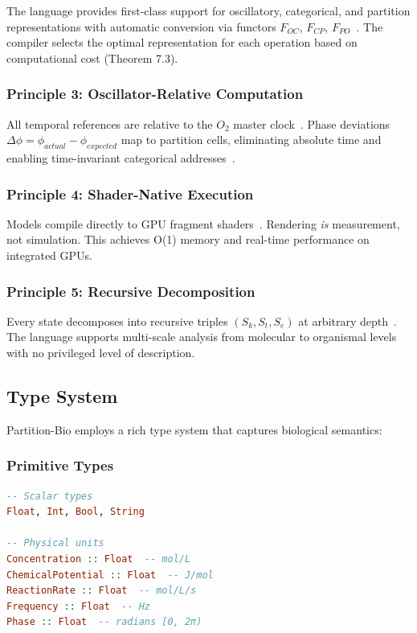 \documentclass[12pt,a4paper]{article}
\begin{document}
The language provides first-class support for oscillatory, categorical, and partition representations with automatic conversion via functors $F_{OC}$, $F_{CP}$, $F_{PO}$~\cite{sachikonye2026sentropy}. The compiler selects the optimal representation for each operation based on computational cost (Theorem 7.3).

\subsubsection{Principle 3: Oscillator-Relative Computation}

All temporal references are relative to the $O_2$ master clock~\cite{sachikonye2026equations}. Phase deviations $\Delta\phi = \phi_{actual} - \phi_{expected}$ map to partition cells, eliminating absolute time and enabling time-invariant categorical addresses~\cite{sachikonye2026cellular}.

\subsubsection{Principle 4: Shader-Native Execution}

Models compile directly to GPU fragment shaders~\cite{sachikonye2026sbs}. Rendering \textit{is} measurement, not simulation. This achieves O(1) memory and real-time performance on integrated GPUs.

\subsubsection{Principle 5: Recursive Decomposition}

Every state decomposes into recursive triples $(S_k, S_t, S_e)$ at arbitrary depth~\cite{sachikonye2026sentropy}. The language supports multi-scale analysis from molecular to organismal levels with no privileged level of description.

\subsection{Type System}

Partition-Bio employs a rich type system that captures biological semantics:

\subsubsection{Primitive Types}

\begin{lstlisting}[language=Haskell, basicstyle=\ttfamily\small]
-- Scalar types
Float, Int, Bool, String

-- Physical units
Concentration :: Float  -- mol/L
ChemicalPotential :: Float  -- J/mol
ReactionRate :: Float  -- mol/L/s
Frequency :: Float  -- Hz
Phase :: Float  -- radians [0, 2π)
\end{lstlisting}
\end{document}
